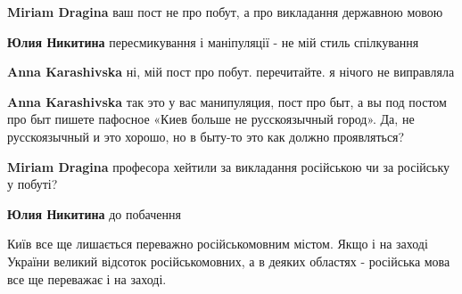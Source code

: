 \begin{itemize}
\begin{itemize}
\textbf{Miriam Dragina} ваш пост не про побут, а про викладання державною мовою

 
\textbf{Юлия Никитина} пересмикування і маніпуляції - не мій стиль спілкування

 
\textbf{Anna Karashivska} ні, мій пост про побут. перечитайте. я нічого не виправляла

 
\textbf{Anna Karashivska} так это у вас манипуляция, пост про быт, а вы под постом про быт пишете пафосное «Киев больше не русскоязычный город». Да, не русскоязычный и это хорошо, но в быту-то это как должно проявляться?

 
\textbf{Miriam Dragina} професора хейтили за викладання російською чи за російську у побуті?

 
\textbf{Юлия Никитина} до побачення

 

Київ все ще лишається переважно російськомовним містом. Якщо і на заході
України великий відсоток російськомовних, а в деяких областях - російська мова
все ще переважає і на заході.



\end{itemize}
\end{itemize}
